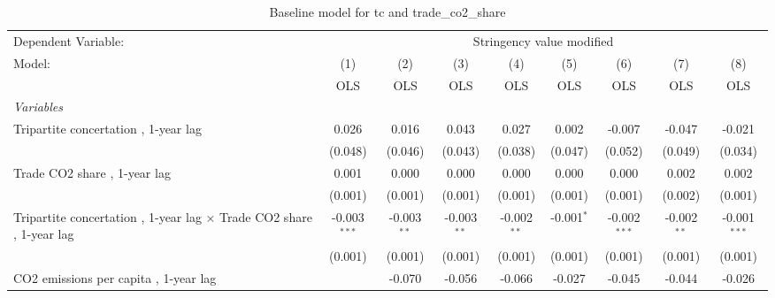 
\begin{table}[htbp]
   \caption{Baseline model for tc and trade\_co2\_share}
   \centering
   \begin{tabular}{lcccccccc}
      \toprule
      Dependent Variable: & \multicolumn{8}{c}{Stringency value modified}\\
      Model:                                                                      & (1)            & (2)           & (3)           & (4)           & (5)           & (6)            & (7)           & (8)\\  
                                                                                  &  OLS           & OLS           & OLS           & OLS           & OLS           & OLS            & OLS           & OLS\\  
      \midrule
      \emph{Variables}\\
      Tripartite concertation , 1-year lag                                        & 0.026          & 0.016         & 0.043         & 0.027         & 0.002         & -0.007         & -0.047        & -0.021\\   
                                                                                  & (0.048)        & (0.046)       & (0.043)       & (0.038)       & (0.047)       & (0.052)        & (0.049)       & (0.034)\\   
      Trade CO2 share , 1-year lag                                                & 0.001          & 0.000         & 0.000         & 0.000         & 0.000         & 0.000          & 0.002         & 0.002\\   
                                                                                  & (0.001)        & (0.001)       & (0.001)       & (0.001)       & (0.001)       & (0.001)        & (0.002)       & (0.001)\\   
      Tripartite concertation , 1-year lag $\times$ Trade CO2 share , 1-year lag  & -0.003$^{***}$ & -0.003$^{**}$ & -0.003$^{**}$ & -0.002$^{**}$ & -0.001$^{*}$  & -0.002$^{***}$ & -0.002$^{**}$ & -0.001$^{***}$\\   
                                                                                  & (0.001)        & (0.001)       & (0.001)       & (0.001)       & (0.001)       & (0.001)        & (0.001)       & (0.001)\\   
      CO2 emissions per capita , 1-year lag                                       &                & -0.070        & -0.056        & -0.066        & -0.027        & -0.045         & -0.044        & -0.026\\   

\end{tabular}
\end{table}
